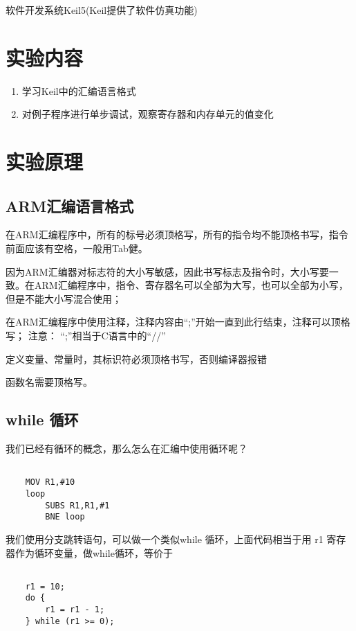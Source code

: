 \documentclass[a4paper,10pt,UTF8]{paper}
\numberwithin{equation}{section}
\numberwithin{figure}{section}
\begin{document}
软件开发系统Keil5(Keil提供了软件仿真功能)

\section{实验内容}

\begin{enumerate}
	\item 学习Keil中的汇编语言格式
	\item 对例子程序进行单步调试，观察寄存器和内存单元的值变化
\end{enumerate}

\section{实验原理}

\subsection{ARM汇编语言格式}

在ARM汇编程序中，所有的标号必须顶格写，所有的指令均不能顶格书写，指令前面应该有空格，一般用Tab健。

因为ARM汇编器对标志符的大小写敏感，因此书写标志及指令时，大小写要一致。在ARM汇编程序中，指令、寄存器名可以全部为大写，也可以全部为小写，但是不能大小写混合使用；

在ARM汇编程序中使用注释，注释内容由“;”开始一直到此行结束，注释可以顶格写；
注意：
“;”相当于C语言中的“//”

定义变量、常量时，其标识符必须顶格书写，否则编译器报错

函数名需要顶格写。


\subsection{while 循环}

我们已经有循环的概念，那么怎么在汇编中使用循环呢？

\begin{verbatim}

    MOV R1,#10
    loop
        SUBS R1,R1,#1
        BNE loop

\end{verbatim}

我们使用分支跳转语句，可以做一个类似while 循环，上面代码相当于用 r1 寄存器作为循环变量，做while循环，等价于

\begin{verbatim}

    r1 = 10;
    do {
        r1 = r1 - 1;
    } while (r1 >= 0);

\end{verbatim}
\end{document}
